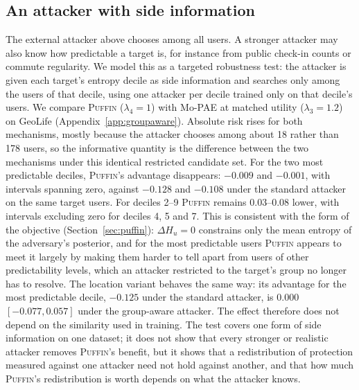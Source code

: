 \documentclass[sigconf,anonymous,review]{acmart}
\newcommand{\puffin}{\textsc{Puffin}}
\begin{document}
\subsection{An attacker with side information}
\label{sec:results-groupaware}
The external attacker above chooses among all users. A stronger attacker may also know how predictable a target is, for instance from public check-in counts or commute regularity. We model this as a targeted robustness test: the attacker is given each target's entropy decile as side information and searches only among the users of that decile, using one attacker per decile trained only on that decile's users. We compare \puffin{} ($\lambda_4=1$) with Mo-PAE at matched utility ($\lambda_3=1.2$) on GeoLife (Appendix~\ref{app:groupaware}). Absolute risk rises for both mechanisms, mostly because the attacker chooses among about 18 rather than 178 users, so the informative quantity is the difference between the two mechanisms under this identical restricted candidate set. For the two most predictable deciles, \puffin's advantage disappears: $-0.009$ and $-0.001$, with intervals spanning zero, against $-0.128$ and $-0.108$ under the standard attacker on the same target users. For deciles 2--9 \puffin{} remains 0.03--0.08 lower, with intervals excluding zero for deciles 4, 5 and 7. This is consistent with the form of the objective (Section~\ref{sec:puffin}): $\Delta H_u=0$ constrains only the mean entropy of the adversary's posterior, and for the most predictable users \puffin{} appears to meet it largely by making them harder to tell apart from users of other predictability levels, which an attacker restricted to the target's group no longer has to resolve. The location variant behaves the same way: its advantage for the most predictable decile, $-0.125$ under the standard attacker, is $0.000$ $[-0.077, 0.057]$ under the group-aware attacker. The effect therefore does not depend on the similarity used in training. The test covers one form of side information on one dataset; it does not show that every stronger or realistic attacker removes \puffin's benefit, but it shows that a redistribution of protection measured against one attacker need not hold against another, and that how much \puffin's redistribution is worth depends on what the attacker knows.
\end{document}
